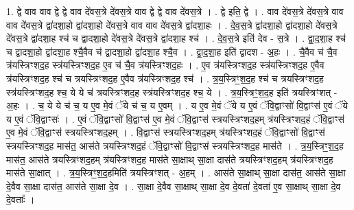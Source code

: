 \documentclass[17pt]{extarticle}
\begin{document}
1. द्वे वाव वाव द्वे द्वे वाव दे॑वस॒त्रे दे॑वस॒त्रे वाव द्वे द्वे वाव दे॑वस॒त्रे । . द्वे इति॒ द्वे । . वाव दे॑वस॒त्रे दे॑वस॒त्रे वाव वाव दे॑वस॒त्रे द्वा॑दशा॒हो द्वा॑दशा॒हो दे॑वस॒त्रे वाव वाव दे॑वस॒त्रे द्वा॑दशा॒हः । . दे॒व॒स॒त्रे द्वा॑दशा॒हो द्वा॑दशा॒हो दे॑वस॒त्रे दे॑वस॒त्रे द्वा॑दशा॒ह श्च॑ च द्वादशा॒हो दे॑वस॒त्रे दे॑वस॒त्रे द्वा॑दशा॒ह श्च॑ । . दे॒व॒स॒त्रे इति॑ देव - स॒त्रे । . द्वा॒द॒शा॒ह श्च॑ च द्वादशा॒हो द्वा॑दशा॒ह श्चै॒वैव च॑ द्वादशा॒हो द्वा॑दशा॒ह श्चै॒व । . द्वा॒द॒शा॒ह इति॑ द्वादश - अ॒हः । . चै॒वैव च॑ चै॒व त्र॑यस्त्रिꣳशद॒ह स्त्र॑यस्त्रिꣳशद॒ह ए॒व च॑ चै॒व त्र॑यस्त्रिꣳशद॒हः । . ए॒व त्र॑यस्त्रिꣳशद॒ह स्त्र॑यस्त्रिꣳशद॒ह ए॒वैव त्र॑यस्त्रिꣳशद॒ह श्च॑ च त्रयस्त्रिꣳशद॒ह ए॒वैव त्र॑यस्त्रिꣳशद॒ह श्च॑ । . त्र॒य॒स्त्रिꣳ॒॒श॒द॒ह श्च॑ च त्रयस्त्रिꣳशद॒ह स्त्र॑यस्त्रिꣳशद॒ह श्च॒ ये ये च॑ त्रयस्त्रिꣳशद॒ह स्त्र॑यस्त्रिꣳशद॒ह श्च॒ ये । . त्र॒य॒स्त्रिꣳ॒॒श॒द॒ह इति॑ त्रयस्त्रिꣳशत् - अ॒हः । . च॒ ये ये च॑ च॒ य ए॒व मे॒वं ॅये च॑ च॒ य ए॒वम् । . य ए॒व मे॒वं ॅये य ए॒वं ॅवि॒द्वाꣳसो॑ वि॒द्वाꣳस॑ ए॒वं ॅये य ए॒वं ॅवि॒द्वाꣳसः॑ । . ए॒वं ॅवि॒द्वाꣳसो॑ वि॒द्वाꣳस॑ ए॒व मे॒वं ॅवि॒द्वाꣳस॑ स्त्रयस्त्रिꣳशद॒हम् त्र॑यस्त्रिꣳशद॒हं ॅवि॒द्वाꣳस॑ ए॒व मे॒वं ॅवि॒द्वाꣳस॑ स्त्रयस्त्रिꣳशद॒हम् । . वि॒द्वाꣳस॑ स्त्रयस्त्रिꣳशद॒हम् त्र॑यस्त्रिꣳशद॒हं ॅवि॒द्वाꣳसो॑ वि॒द्वाꣳस॑ स्त्रयस्त्रिꣳशद॒ह मास॑त॒ आस॑ते त्रयस्त्रिꣳशद॒हं ॅवि॒द्वाꣳसो॑ वि॒द्वाꣳस॑ स्त्रयस्त्रिꣳशद॒ह मास॑ते । . त्र॒य॒स्त्रिꣳ॒॒श॒द॒ह मास॑त॒ आस॑ते त्रयस्त्रिꣳशद॒हम् त्र॑यस्त्रिꣳशद॒ह मास॑ते सा॒क्षाथ् सा॒क्षा दास॑ते त्रयस्त्रिꣳशद॒हम् त्र॑यस्त्रिꣳशद॒ह मास॑ते सा॒क्षात् । . त्र॒य॒स्त्रिꣳ॒॒श॒द॒हमिति॑ त्रयस्त्रिꣳशत् - अ॒हम् । . आस॑ते सा॒क्षाथ् सा॒क्षा दास॑त॒ आस॑ते सा॒क्षा दे॒वैव सा॒क्षा दास॑त॒ आस॑ते सा॒क्षा दे॒व । . सा॒क्षा दे॒वैव सा॒क्षाथ् सा॒क्षा दे॒व दे॒वता॑ दे॒वता॑ ए॒व सा॒क्षाथ् सा॒क्षा दे॒व दे॒वताः᳚ । \newline
\end{document}
